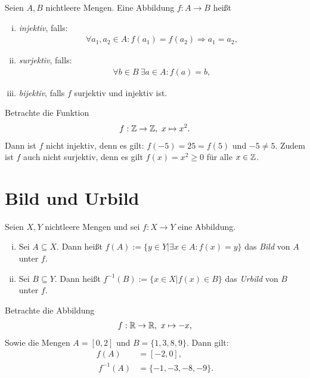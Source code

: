 \begin{mydef}
Seien $A,B$ nichtleere Mengen.
Eine Abbildung $f:A \to B$ heißt
    \begin{enumerate}[(i)]
        \item
        \textit{injektiv}, falls:
        \begin{align*}
            \forall a_1,a_2 \in A: f(a_1)=f(a_2) \Rightarrow a_1 = a_2,
        \end{align*}
        \item
        \textit{surjektiv}, falls:
        \begin{align*}
            \forall b \in B \ \exists a \in A: f(a) = b,
        \end{align*}
        \item
        \textit{bijektiv}, falls $f$ surjektiv und injektiv ist.
    \end{enumerate}
\end{mydef}

\begin{example}
Betrachte die Funktion
\begin{align*}
    f: \mathbb{Z} \to \mathbb{Z}, \ x \mapsto x^2.
\end{align*}
Dann ist $f$ nicht injektiv, denn es gilt: $f(-5) = 25 = f(5)$ und $-5 \neq 5$.
Zudem ist $f$ auch nicht surjektiv, denn es gilt $f(x) = x^2 \geq 0$ für alle
$x \in \mathbb{Z}$.
\end{example}

\section{Bild und Urbild}

\begin{mydef}
Seien $X,Y$ nichtleere Mengen und sei $f:X \to Y$ eine Abbildung.
    \begin{enumerate}[(i)]
        \item
        Sei $A \subseteq X$. Dann heißt $f(A):=\{y \in Y | \exists x \in A : f(x) = y \}$ das \textit{Bild} von $A$ unter $f$.
        \item
        Sei $B \subseteq Y$. Dann heißt $f^{-1}(B):=\{x \in X | f(x) \in B \}$ das \textit{Urbild} von $B$ unter $f$.
    \end{enumerate}
\end{mydef}

\begin{example}
Betrachte die Abbildung
\begin{align*}
    f: \mathbb{R} \to \mathbb{R}, \ x \mapsto -x,
\end{align*}
Sowie die Mengen $A = [0,2]$ und $B = \{1,3,8,9\}$.
Dann gilt:
\begin{align*}
    f(A) &= [-2,0], \\\
    f^{-1}(A) &= \{-1, -3,-8,-9\}.
\end{align*}
\end{example}

